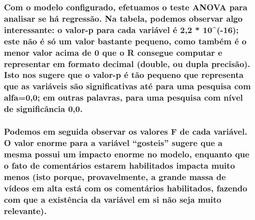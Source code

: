 \documentclass[]{article}
\begin{document}
\hypertarget{com-o-modelo-configurado-efetuamos-o-teste-anova-para-analisar-se-ha-regressao.-na-tabela-podemos-observar-algo-interessante-o-valor-p-para-cada-variavel-e-22-10-16-este-nao-e-so-um-valor-bastante-pequeno-como-tambem-e-o-menor-valor-acima-de-0-que-o-r-consegue-computar-e-representar-em-formato-decimal-double-ou-dupla-precisao.-isto-nos-sugere-que-o-valor-p-e-tao-pequeno-que-representa-que-as-variaveis-sao-significativas-ate-para-uma-pesquisa-com-alfa00-em-outras-palavras-para-uma-pesquisa-com-nivel-de-significancia-00.}{%
\subsubsection{Com o modelo configurado, efetuamos o teste ANOVA para
analisar se há regressão. Na tabela, podemos observar algo interessante:
o valor-p para cada variável é 2,2 * 10\^{}(-16); este não é só um valor
bastante pequeno, como também é o menor valor acima de 0 que o R
consegue computar e representar em formato decimal (double, ou dupla
precisão). Isto nos sugere que o valor-p é tão pequeno que representa
que as variáveis são significativas até para uma pesquisa com alfa=0,0;
em outras palavras, para uma pesquisa com nível de significância
0,0.}\label{com-o-modelo-configurado-efetuamos-o-teste-anova-para-analisar-se-ha-regressao.-na-tabela-podemos-observar-algo-interessante-o-valor-p-para-cada-variavel-e-22-10-16-este-nao-e-so-um-valor-bastante-pequeno-como-tambem-e-o-menor-valor-acima-de-0-que-o-r-consegue-computar-e-representar-em-formato-decimal-double-ou-dupla-precisao.-isto-nos-sugere-que-o-valor-p-e-tao-pequeno-que-representa-que-as-variaveis-sao-significativas-ate-para-uma-pesquisa-com-alfa00-em-outras-palavras-para-uma-pesquisa-com-nivel-de-significancia-00.}}

\hypertarget{podemos-em-seguida-observar-os-valores-f-de-cada-variavel.-o-valor-enorme-para-a-variavel-gosteis-sugere-que-a-mesma-possui-um-impacto-enorme-no-modelo-enquanto-que-o-fato-de-comentarios-estarem-habilitados-impacta-muito-menos-isto-porque-provavelmente-a-grande-massa-de-videos-em-alta-esta-com-os-comentarios-habilitados-fazendo-com-que-a-existencia-da-variavel-em-si-nao-seja-muito-relevante.}{%
\subsubsection{Podemos em seguida observar os valores F de cada
variável. O valor enorme para a variável ``gosteis'' sugere que a mesma
possui um impacto enorme no modelo, enquanto que o fato de comentários
estarem habilitados impacta muito menos (isto porque, provavelmente, a
grande massa de vídeos em alta está com os comentários habilitados,
fazendo com que a existência da variável em si não seja muito
relevante).}\label{podemos-em-seguida-observar-os-valores-f-de-cada-variavel.-o-valor-enorme-para-a-variavel-gosteis-sugere-que-a-mesma-possui-um-impacto-enorme-no-modelo-enquanto-que-o-fato-de-comentarios-estarem-habilitados-impacta-muito-menos-isto-porque-provavelmente-a-grande-massa-de-videos-em-alta-esta-com-os-comentarios-habilitados-fazendo-com-que-a-existencia-da-variavel-em-si-nao-seja-muito-relevante.}}
\end{document}
